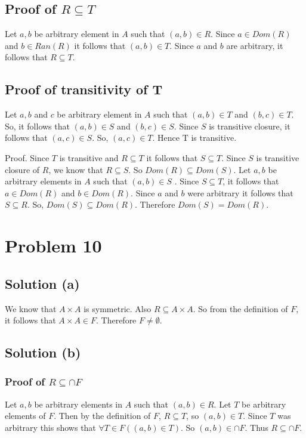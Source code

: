\documentclass{article}
\begin{document}
\subsection{Proof of $R \subseteq T$}
Let $a,b$ be arbitrary element in $A$ such that $(a,b) \in R$. Since
$a \in Dom(R)$ and $b \in Ran(R)$ it follows that $(a,b) \in T$. Since
$a$ and $b$ are arbitrary, it follows that $R \subseteq T$.

\subsection{Proof of transitivity of T}
Let $a,b$ and $c$ be arbitrary element in $A$ such that $(a,b) \in T$
and $(b,c) \in T$. So, it follows that $(a,b) \in S$ and $(b,c) \in
S$. Since $S$ is transitive closure, it follows that $(a,c) \in S$.
So, $(a,c) \in T$. Hence T is transitive.

Proof. Since $T$ is transitive and $R \subseteq T$ it follows that $S
\subseteq T$. Since $S$ is transitive closure of $R$, we know that $R
\subseteq S$. So $Dom(R) \subseteq Dom(S)$.
Let $a,b$ be arbitrary elements in $A$ such that $(a,b) \in S$ . Since
$S \subseteq T$, it follows that $a \in Dom(R)$ and $b \in Dom(R)$.
Since $a$ and $b$ were arbitrary it follows that $S \subseteq R$. So,
$Dom(S) \subseteq Dom(R)$. Therefore $Dom(S) = Dom(R)$.

\section{Problem 10}
\subsection{Solution (a)}
We know that $A \times A$ is symmetric. Also $R \subseteq A \times A$.
So from the definition of $F$, it follows that $A \times A \in F$.
Therefore $F \neq \emptyset$.

\subsection{Solution (b)}
\subsubsection{Proof of  $R \subseteq \cap F$}
Let $a,b$ be arbitrary elements in $A$ such that $(a,b) \in R$. Let
$T$ be arbitrary elements of $F$. Then by the definition of $F$, $R
\subseteq T$, so $(a,b) \in T$. Since $T$ was arbitrary this shows
that $\forall T \in F((a,b) \in T)$. So $(a,b) \in \cap F$. Thus $R
\subseteq \cap F$.
\end{document}
